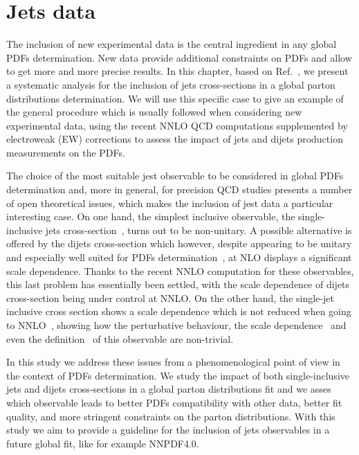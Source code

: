 \chapter{Jets data}
\label{ch:jets}
The inclusion of new experimental data is the central ingredient in any global PDFs determination.
New data provide additional constraints on PDFs and allow to get more and more precise results. 
In this chapter, based on Ref.~\cite{AbdulKhalek:2020jut}, we present a systematic analysis for the inclusion 
of jets cross-sections in a global parton distributions determination.
We will use this specific case to give an example of the general procedure which is usually followed 
when considering new experimental data, using the recent NNLO QCD computations
supplemented by electroweak (EW) corrections to assess the impact of jets and dijets production measurements on the PDFs. 

% 
The choice of the most suitable jest observable to be considered in global PDFs determination and, more in general,
for precision QCD studies presents a number of open theoretical issues, which makes the inclusion of
jest data a particular interesting case.
On one hand, the simplest inclusive observable, 
the single-inclusive jets cross-section~\cite{Ellis:1990ek,Aversa:1988fv}, turns out to be non-unitary.
A possible alternative is offered by the dijets cross-section which however, despite appearing to be 
unitary and especially well suited for PDFs determination~\cite{Giele:1994xd}, at NLO displays a significant scale dependence. 
Thanks to the recent NNLO computation for these observables, this last problem has essentially been settled,
with the scale dependence of dijets cross-section being under control at NNLO.
On the other hand, the single-jet inclusive cross section
shows a scale dependence which is not reduced when going to NNLO~\cite{Currie:2017ctp}, 
showing how the perturbative behaviour, the scale dependence~\cite{Currie:2018xkj} and even the definition~\cite{Cacciari:2019qjx} 
of this observable are non-trivial.  

%
In this study we address these issues from a phenomenological point of view in the context of PDFs determination. 
We study the impact of both single-inclusive
jets and dijets cross-sections in a global parton distributions fit and we
asses which observable leads to better PDFs compatibility with other data, better fit quality,
and more stringent constraints on the parton distributions. 
With this study we aim to provide a guideline for the inclusion of jets observables in a future global fit,
like for example NNPDF4.0.

